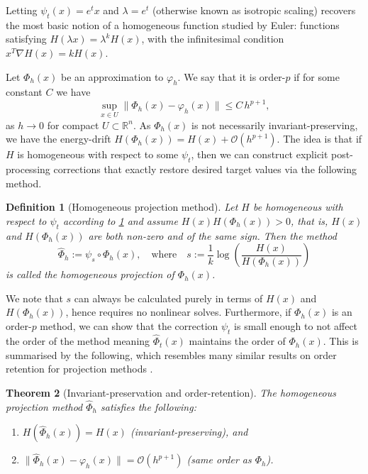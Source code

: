 \documentclass[final,3p,times]{elsarticle}
\newtheorem{theorem}{Theorem}[section]
\newtheorem{definition}[theorem]{Definition}
\newcommand{\R}{\mathbb{R}}
\begin{document}
Letting $\psi_t(x) = e^{t} x$ and $\lambda=e^{t}$ (otherwise known as isotropic scaling) recovers the most basic notion of a homogeneous function studied by Euler: functions satisfying $H(\lambda x) = \lambda^k H(x)$, with the infinitesimal condition $x^T\nabla H(x)=k H(x)$.

Let $\Phi_h(x)$ be an approximation to $\varphi_h$. We say that it is order-$p$ if for some constant $C$ we have
$$
\sup_{x\in U}\|\Phi_h(x)-\varphi_h(x)\|\le C\,h^{p+1},
$$
as $h\to 0$ for compact $U\subset\R^n$. As $\Phi_h(x)$ is not necessarily invariant-preserving, we have the energy-drift $H(\Phi_h(x)) = H(x) + \mathcal{O}(h^{p+1}).$ The idea is that if $H$ is homogeneous with respect to some $\psi_t$, then we can construct explicit post-processing corrections that exactly restore desired target values via the following method.
\begin{definition}[Homogeneous projection method]\label{def:hom proj method}
    Let $H$ be homogeneous with respect to $\psi_t$ according to \ref{def:hom proj method} and assume $H(x)H(\Phi_h(x))>0$, that is, $H(x)$ and $H(\Phi_h(x))$ are both non-zero and of the same sign. Then the method
    \begin{equation}
      \widehat\Phi_{h}:=\psi_{s}\circ\Phi_h(x),\quad\text{where} \quad s:= \frac{1}{k}\log\left(\frac{H(x)}{H(\Phi_h(x))}\right)
    \end{equation}
    is called the homogeneous projection of $\Phi_h(x)$.
\end{definition}
We note that $s$ can always be calculated purely in terms of $H(x)$ and $H(\Phi_h(x))$, hence requires no nonlinear solves. Furthermore, if $\Phi_h(x)$ is an order-$p$ method, we can show that the correction $\psi_t$ is small enough to not affect the order of the method meaning $\widehat\Phi_{t}(x)$ maintains the order of $\Phi_h(x)$. This is summarised by the following, which resembles many similar results on order retention for projection methods \cite{norton2015discrete, calvo2006preservation}.  
\begin{theorem}[Invariant-preservation and order-retention]\label{thm:hom proj method}
    The homogeneous projection method $\widehat{\Phi}_h$ satisfies the following:
    \begin{enumerate}
    \item $H(\widehat\Phi_{h}(x)) = H(x)$ (invariant-preserving), and 
    \item $\|\widehat\Phi_{h}(x)-\varphi_h(x)\| = \mathcal{O}(h^{p+1})$ (same order as $\Phi_h$).
    \end{enumerate}
\end{theorem}
\end{document}
